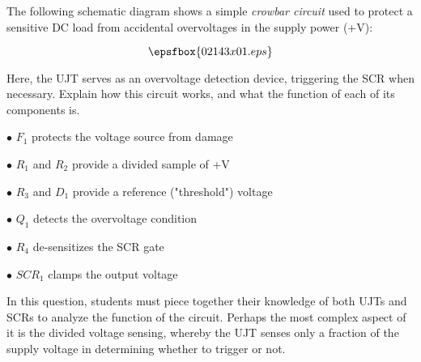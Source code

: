 

The following schematic diagram shows a simple {\it crowbar circuit} used to protect a sensitive DC load from accidental overvoltages in the supply power (+V):

$$\epsfbox{02143x01.eps}$$

Here, the UJT serves as an overvoltage detection device, triggering the SCR when necessary.  Explain how this circuit works, and what the function of each of its components is.







\medskip
\goodbreak
\item{$\bullet$} $F_1$ protects the voltage source from damage
\item{$\bullet$} $R_1$ and $R_2$ provide a divided sample of +V
\item{$\bullet$} $R_3$ and $D_1$ provide a reference ("threshold") voltage
\item{$\bullet$} $Q_1$ detects the overvoltage condition
\item{$\bullet$} $R_4$ de-sensitizes the SCR gate
\item{$\bullet$} $SCR_1$ clamps the output voltage
\medskip







In this question, students must piece together their knowledge of both UJTs and SCRs to analyze the function of the circuit.  Perhaps the most complex aspect of it is the divided voltage sensing, whereby the UJT senses only a fraction of the supply voltage in determining whether to trigger or not.





